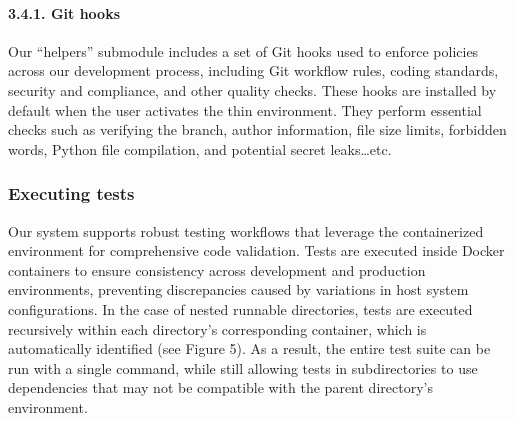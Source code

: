 \documentclass{article}
\begin{document}
%
%
%

\paragraph{3.4.1. Git hooks}

Our ``helpers'' submodule includes a set of Git hooks used to enforce policies
across our development process, including Git workflow rules, coding standards, security
and compliance, and other quality checks. These hooks are installed by default when
the user activates the thin environment. They perform essential checks such as
verifying the branch, author information, file size limits, forbidden words,
Python file compilation, and potential secret leaks\ldots etc.

\subsubsection{Executing tests}

Our system supports robust testing workflows that leverage the containerized environment
for comprehensive code validation. Tests are executed inside Docker containers
to ensure consistency across development and production environments, preventing
discrepancies caused by variations in host system configurations. In the case of
nested runnable directories, tests are executed recursively within each directory's
corresponding container, which is automatically identified (see Figure 5). As a result,
the entire test suite can be run with a single command, while still allowing tests
in subdirectories to use dependencies that may not be compatible with the parent
directory's environment.

%
%
\end{document}
